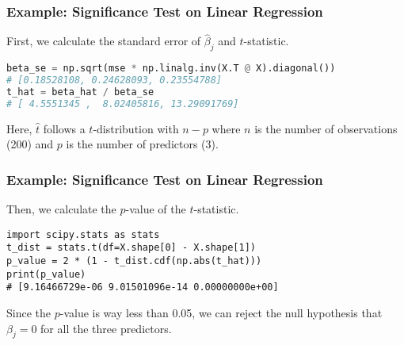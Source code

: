 \documentclass[beamer, en, version=2.0]{huangfusl-template}
\begin{document}
    \begin{frame}[fragile]
        \frametitle{Example: Significance Test on Linear Regression}

        First, we calculate the standard error of $\hat\beta_j$ and $t$-statistic.

\begin{lstlisting}[language=python]
beta_se = np.sqrt(mse * np.linalg.inv(X.T @ X).diagonal())
# [0.18528108, 0.24628093, 0.23554788]
t_hat = beta_hat / beta_se
# [ 4.5551345 ,  8.02405816, 13.29091769]
\end{lstlisting}

        Here, $\hat t$ follows a $t$-distribution with $n-p$ where $n$ is the number of observations (200) and $p$ is the number of predictors (3).
    \end{frame}
    \begin{frame}[fragile]
        \frametitle{Example: Significance Test on Linear Regression}

        Then, we calculate the $p$-value of the $t$-statistic.

\begin{lstlisting}
import scipy.stats as stats
t_dist = stats.t(df=X.shape[0] - X.shape[1])
p_value = 2 * (1 - t_dist.cdf(np.abs(t_hat)))
print(p_value)
# [9.16466729e-06 9.01501096e-14 0.00000000e+00]
\end{lstlisting}

        Since the $p$-value is way less than 0.05, we can reject the null hypothesis that $\beta_j = 0$ for all the three predictors.
    \end{frame}
\end{document}
